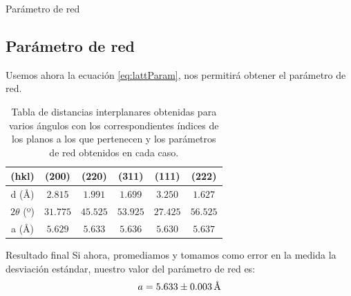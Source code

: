 \documentclass{beamer}
\begin{document}
\begin{frame}{Parámetro de red}
    \subsection{Parámetro de red}
    Usemos ahora la ecuación \ref{eq:lattParam}, nos permitirá obtener el parámetro de red.
    \begin{table}
        \begin{center}
            \begin{tabular}{|c|c|c|c|c|c|}
                \hline
                (hkl) & (200) & (220) & (311) & (111) & (222) \\ \hline
                d (\r{A}) & $2.815$ & $1.991$ & $1.699$ & $3.250$ & $1.627$ \\ \hline
                $2\theta$ (º) & $31.775$ & $45.525$ & $53.925$ & $27.425$ & $56.525$ \\ \hline
                a (\r{A}) & $5.629$ & $5.633$ & $5.636$ & $5.630$ & $5.637$ \\ \hline
            \end{tabular}
        \end{center}
        \caption{Tabla de distancias interplanares obtenidas para varios ángulos con los correspondientes índices de los planos a los que pertenecen y los parámetros de red obtenidos en cada caso.}
    \end{table}
    \begin{block}{Resultado final}
        Si ahora, promediamos y tomamos como error en la medida la desviación estándar, nuestro valor del parámetro de red es:
        \begin{equation}
            a = 5.633 \pm 0.003 \, \text{\r{A}}
        \end{equation}
    \end{block}
\end{frame}
\end{document}
